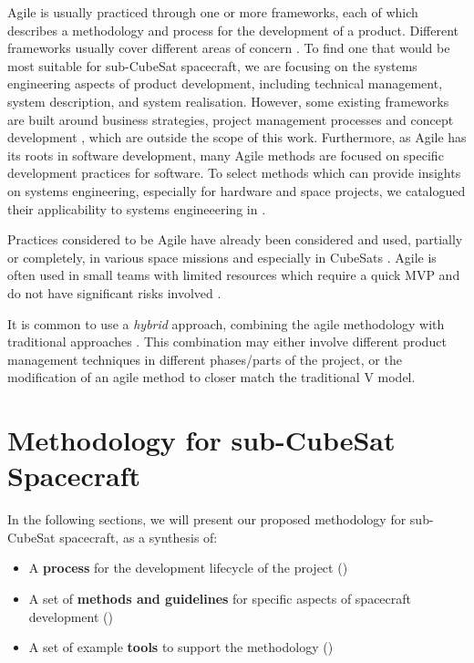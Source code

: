 \documentclass[journal,10pt]{IEEEtran}
\begin{document}
Agile is usually practiced through one or more frameworks, each of which describes a methodology and process for the development of a product.
Different frameworks usually cover different areas of concern \autocite{boehmBalancingAgilityDiscipline2004}. To find one that would be most suitable for sub-CubeSat spacecraft, we are focusing on the systems engineering aspects of product development, including technical management, system description, and system realisation. However, some existing frameworks are built around business strategies, project management processes and concept development \autocite{boehmBalancingAgilityDiscipline2004}, which are outside the scope of this work. Furthermore, as Agile has its roots in software development, many Agile methods are focused on specific development practices for software. To select methods which can provide insights on systems engineering, especially for hardware and space projects, we catalogued their applicability to systems engineeering in .



Practices considered to be Agile have already been considered and used, partially or completely, in various space missions \autocite{carpenterAgileTooFragile2014, dillonFasterBetterCheaperProjectsToo2015, carsonCanSystemsEngineering2013} and especially in CubeSats \autocite{honore-livermoreCubeSatsUniversityUsing2019,berthoudUniversityCubeSatProject2019}. Agile is often used in small teams with limited resources which require a quick \acl{MVP} and do not have significant risks involved \autocite{carsonCanSystemsEngineering2013}.

It is common to use a \textit{hybrid} approach, combining the agile methodology with traditional approaches \autocite{carpenterAgileTooFragile2014,garzanitiHybridAgileProduct2020}. This combination may either involve different product management techniques in different phases/parts of the project, or the modification of an agile method to closer match the traditional V model.


\section{Methodology for sub-CubeSat Spacecraft}
\label{sec:methodology}


In the following sections, we will present our proposed methodology for sub-CubeSat spacecraft, as a synthesis of: \autocite{estefanSurveyModelBasedSystems2008}
\begin{itemize}
	\item A \textbf{process} for the development lifecycle of the project ()
	\item A set of \textbf{methods and guidelines} for specific aspects of spacecraft development ()
	\item A set of example \textbf{tools} to support the methodology ()
\end{itemize}
\end{document}
